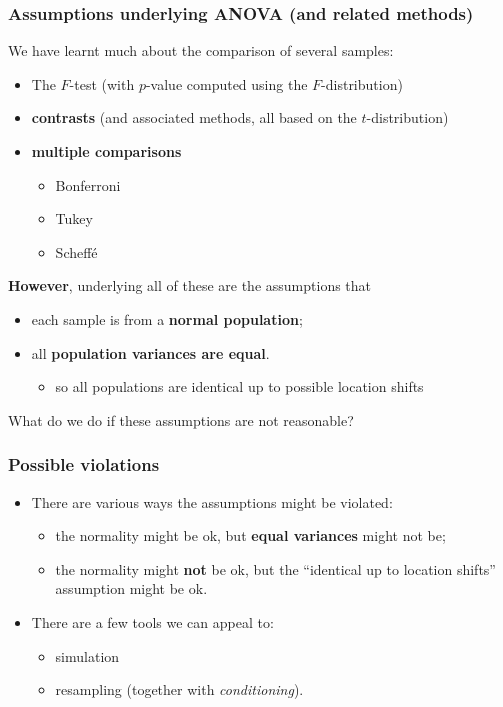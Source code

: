 \documentclass[a4paper]{article}
\begin{document}
\subsubsection{Assumptions underlying ANOVA (and related methods)}
We have learnt much about the comparison of several samples:
\begin{itemize}
	\item The \( F \)-test (with \( p \)-value computed using the \( F \)-distribution)
	\item \textcolor{mygreen}{\textbf{contrasts}} (and associated methods, all based on the \( t \)-distribution)
	\item \textcolor{mygreen}{\textbf{multiple comparisons}}
	\begin{itemize}
		\item Bonferroni
		\item Tukey
		\item Scheffé
	\end{itemize}
\end{itemize}
\textbf{However}, underlying all of these are the assumptions that
\begin{itemize}
	\item each sample is from a \textcolor{myred}{\textbf{normal population}};
	\item all \textcolor{myred}{\textbf{population variances are equal}}.
	\begin{itemize}
		\item so all populations are identical up to possible location shifts
	\end{itemize}
\end{itemize}
What do we do if these assumptions are not reasonable?
\subsubsection{Possible violations}
\begin{itemize}
	\item There are various ways the assumptions might be violated:
	\begin{itemize}
		\item the normality might be ok, but \textbf{equal variances} might not be;
		\item the normality might \textbf{not} be ok, but the ``identical up to location shifts'' assumption might be ok.
	\end{itemize}
	\item There are a few tools we can appeal to:
	\begin{itemize}
		\item simulation
		\item resampling (together with \textit{conditioning}).
	\end{itemize}
\end{itemize}
\end{document}
